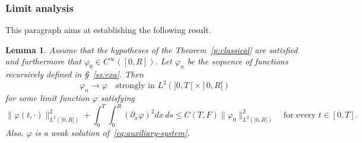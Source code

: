\documentclass[11pt,leqno]{amsart}
\newtheorem{lemma}[theorem]{Lemma}
\numberwithin{equation}{section}
\begin{document}
\subsubsection{Limit analysis}
\label{sss:conex}
This paragraph aims at establishing the following result. 
\begin{lemma}
\label{l:compactness}
Assume that the hypotheses of the Theorem~\ref{p:classical} are satisfied 
and furthermore that ${{\varphi}_0 \in C^\infty ([0, R])}$. Let ${\varphi}_n$ be the sequence of functions recursively defined in \S~\ref{ss:exa}. Then 
\begin{equation}
\label{e:convergence}
     {\varphi}_n \to {\varphi} \quad \text{strongly in $L^2 (]0, T[ \times ]0, R[)$}
\end{equation}
for some limit function ${\varphi}$ satisfying 
\begin{equation}
\label{e:reglim}
   \| \varphi (t, \cdot) \|^2 
   _{L^2(]0, R[) } +  \int_0^{T} \int_0^R (\partial_x \varphi)^2 
   dx \, ds     \leq C(T, F) \| \varphi_0 \|^2_{L^2(]0, R[) }  
   \quad \text{for every $t \in [0, T]$.}
\end{equation}
Also, ${\varphi}$ is a weak solution of~\eqref{eq:auxiliary-system}.  
\end{lemma}
\end{document}
